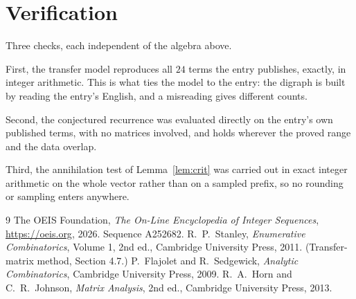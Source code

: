\documentclass[11pt,a4paper]{article}
\theoremstyle{plain}
\theoremstyle{definition}
\begin{document}
\section{Verification}

Three checks, each independent of the algebra above.

First, the transfer model reproduces all $24$ terms the entry publishes, exactly, in
integer arithmetic. This is what ties the model to the entry: the digraph is built by reading
the entry's English, and a misreading gives different counts.

Second, the conjectured recurrence was evaluated directly on the entry's own published terms,
with no matrices involved, and holds wherever the proved range and the data overlap.

Third, the annihilation test of Lemma~\ref{lem:crit} was carried out in exact integer
arithmetic on the whole vector rather than on a sampled prefix, so no rounding or sampling
enters anywhere.

\begin{thebibliography}{9}
 The OEIS Foundation, \emph{The On-Line Encyclopedia of Integer
Sequences}, \url{https://oeis.org}, 2026. Sequence A252682.
 R.~P.~Stanley, \emph{Enumerative Combinatorics}, Volume 1, 2nd ed.,
Cambridge University Press, 2011. (Transfer-matrix method, Section 4.7.)
 P.~Flajolet and R.~Sedgewick, \emph{Analytic Combinatorics}, Cambridge
University Press, 2009.
 R.~A.~Horn and C.~R.~Johnson, \emph{Matrix Analysis}, 2nd ed., Cambridge
University Press, 2013.
\end{thebibliography}
\end{document}
